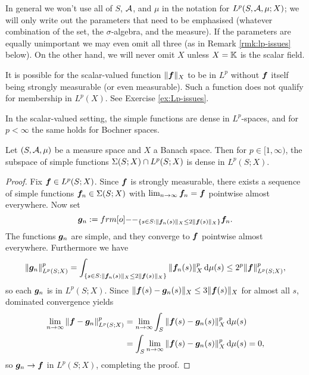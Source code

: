 In general we won't use all of $S$, $\mathcal{A}$, and $\mu$ in the notation for $L^p(S,\mathcal{A},\mu;X)$; we will only write out the parameters that need to be emphasised (whatever combination of the set, the $\sigma$-algebra, and the measure).
If the parameters are equally unimportant we may even omit all three (as in Remark \ref{rmk:lp-issues} below).
On the other hand, we will never omit $X$ unless $X = \mathbb{K}$ is the scalar field.

\begin{rmk}\label{rmk:lp-issues}
  It is possible for the scalar-valued function $\|\bm{f}\|_X$ to be in $L^p$ without $\bm{f}$ itself being strongly measurable (or even measurable).
  Such a function does not qualify for membership in $L^p(X)$.
  See Exercise \ref{ex:Lp-issues}.
\end{rmk}

In the scalar-valued setting, the simple functions are dense in $L^p$-spaces, and for $p < \infty$ the same holds for Bochner spaces. 

\begin{prop}\label{prop:simple-density}
  Let $(S,\mathcal{A},\mu)$ be a measure space and $X$ a Banach space.
  Then for $p \in [1,\infty)$, the subspace of simple functions $\Sigma(S;X) \cap L^p(S;X)$ is dense in $L^p(S;X)$.
\end{prop}

\begin{proof}
  Fix $\bm{f} \in L^p(S;X)$.
  Since $\bm{f}$ is strongly measurable, there exists a sequence of simple functions $\bm{f}_n \in \Sigma(S;X)$ with $\lim_{n \to \infty} \bm{f}_n = \bm{f}$ pointwise almost everywhere.
  Now set
  \begin{equation*}
    \mb{g}_n := \1_{ \{s \in S : \|\mb{f}_n(s)\|_X \leq 2\|\mb{f}(s)\|_X\} } \mb{f}_n.
  \end{equation*}
  The functions $\bm{g}_n$ are simple, and they converge to $\bm{f}$ pointwise almost everywhere.
  Furthermore we have
  \begin{equation*}
    \|\bm{g}_n\|_{L^p(S;X)}^p = \int_{\{s \in S : \|\bm{f}_n(s)\|_X \leq 2\|\bm{f}(s)\|_X \} } \|\bm{f}_n(s)\|_X^p \, \mathrm{d}\mu(s) \leq 2^p \|\bm{f}\|_{L^p(S;X)}^p,
  \end{equation*}
  so each $\bm{g}_n$ is in $L^p(S;X)$.
  Since $\|\bm{f}(s) - \bm{g}_n(s)\|_X \leq 3\|\bm{f}(s)\|_X$ for almost all $s$, dominated convergence yields
  \begin{equation*}
    \begin{aligned}
      \lim_{n \to \infty} \|\bm{f} - \bm{g}_n\|_{L^p(S;X)}^p &= \lim_{n \to \infty} \int_S \|\bm{f}(s) - \bm{g}_n(s)\|_{X}^p \, \mathrm{d}\mu(s) \\
      &= \int_S \lim_{n \to \infty}  \|\bm{f}(s) - \bm{g}_n(s)\|_{X}^p \, \mathrm{d}\mu(s) = 0,
    \end{aligned}
  \end{equation*}
  so $\bm{g}_n \to \bm{f}$ in $L^p(S;X)$, completing the proof.
\end{proof}


